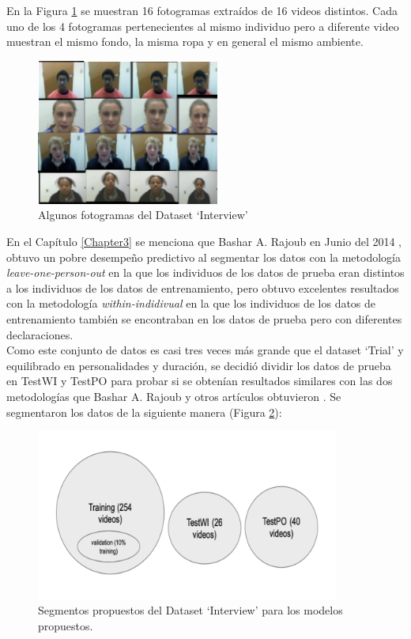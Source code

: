 \begin{onehalfspacing}
En la Figura \ref{fig:Fig_Dataset2} se muestran 16 fotogramas extraídos de 16 videos distintos. Cada uno de los 4 fotogramas pertenecientes al mismo individuo pero a diferente video muestran el mismo fondo, la misma ropa y en general el mismo ambiente.

\begin{figure}[h!]
	\centering
	\includegraphics[width=6cm,keepaspectratio]{XX_Figures/Fig_Dataset2.png}
	\caption{\footnotesize Algunos fotogramas del Dataset `Interview'}
	\label{fig:Fig_Dataset2}
\end{figure}

En el Capítulo \ref{Chapter3} se menciona que Bashar A. Rajoub en Junio del 2014 \cite{Rajoub2014ThermalDetection}, obtuvo un pobre desempeño predictivo al segmentar los datos con la metodología \textit{leave-one-person-out} en la que los individuos de los datos de prueba eran distintos a los individuos de los datos de entrenamiento, pero obtuvo excelentes resultados con la metodología \textit{within-indidivual} en la que los individuos de los datos de entrenamiento también se encontraban en los datos de prueba pero con diferentes declaraciones.\\

Como este conjunto de datos es casi tres veces más grande que el dataset `Trial' y equilibrado en personalidades y duración, se decidió dividir los datos de prueba en TestWI y TestPO para probar si se obtenían resultados similares con las dos metodologías que Bashar A. Rajoub y otros artículos obtuvieron . Se segmentaron los datos de la siguiente manera (Figura \ref{fig:Fig_Dataset2_Segmentos}):

\begin{figure}[th]
	\centering
	\includegraphics[width=10cm,keepaspectratio]{XX_Figures/Fig_Dataset2_Segmentos.png}
	\caption{\footnotesize Segmentos propuestos del Dataset `Interview' para los modelos propuestos.}
	\label{fig:Fig_Dataset2_Segmentos}
\end{figure}


\end{onehalfspacing}
